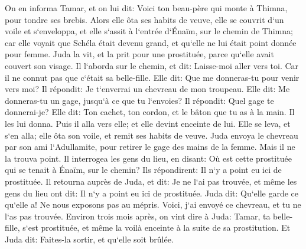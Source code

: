 \verse On en informa Tamar, et on lui dit: Voici ton beau-père qui monte à Thimna, pour tondre ses brebis. 
\verse Alors elle ôta ses habits de veuve, elle se couvrit d`un voile et s`enveloppa, et elle s`assit à l`entrée d`Énaïm, sur le chemin de Thimna; car elle voyait que Schéla était devenu grand, et qu`elle ne lui était point donnée pour femme. 
\verse Juda la vit, et la prit pour une prostituée, parce qu`elle avait couvert son visage. 
\verse Il l`aborda sur le chemin, et dit: Laisse-moi aller vers toi. Car il ne connut pas que c`était sa belle-fille. Elle dit: Que me donneras-tu pour venir vers moi? 
\verse Il répondit: Je t`enverrai un chevreau de mon troupeau. Elle dit: Me donneras-tu un gage, jusqu`à ce que tu l`envoies? 
\verse Il répondit: Quel gage te donnerai-je? Elle dit: Ton cachet, ton cordon, et le bâton que tu as à la main. Il les lui donna. Puis il alla vers elle; et elle devint enceinte de lui. 
\verse Elle se leva, et s`en alla; elle ôta son voile, et remit ses habits de veuve. 
\verse Juda envoya le chevreau par son ami l`Adullamite, pour retirer le gage des mains de la femme. Mais il ne la trouva point. 
\verse Il interrogea les gens du lieu, en disant: Où est cette prostituée qui se tenait à Énaïm, sur le chemin? Ils répondirent: Il n`y a point eu ici de prostituée. 
\verse Il retourna auprès de Juda, et dit: Je ne l`ai pas trouvée, et même les gens du lieu ont dit: Il n`y a point eu ici de prostituée. 
\verse Juda dit: Qu`elle garde ce qu`elle a! Ne nous exposons pas au mépris. Voici, j`ai envoyé ce chevreau, et tu ne l`as pas trouvée. 
\verse Environ trois mois après, on vint dire à Juda: Tamar, ta belle-fille, s`est prostituée, et même la voilà enceinte à la suite de sa prostitution. Et Juda dit: Faites-la sortir, et qu`elle soit brûlée. 
